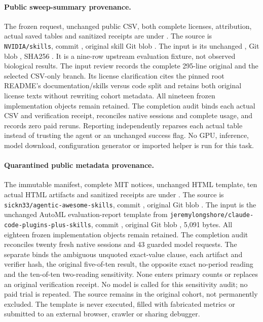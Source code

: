 \documentclass{article}
\theoremstyle{plain}
\theoremstyle{definition}
\newcommand{\id}[1]{\texttt{#1}}
\begin{document}
\paragraph{Public sweep-summary provenance.}
The frozen request, unchanged public CSV, both complete licenses, attribution,
actual saved tables and sanitized receipts are under
.
The source is \id{NVIDIA/skills}, commit
, original skill Git blob
.
The input is its unchanged
,
Git blob , SHA256
.
It is a nine-row upstream evaluation fixture, not observed biological results.
The input review records the complete 295-line original and the selected
CSV-only branch. Its license clarification cites the pinned root README's
documentation/skills versus code split and retains both original license texts
without rewriting cohort metadata. All nineteen frozen implementation objects
remain retained. The completion audit binds each actual CSV and verification
receipt, reconciles native sessions and complete usage, and records zero paid
reruns. Reporting independently reparses each actual table instead of trusting
the agent or an unchanged success flag. No GPU, inference, model download,
configuration generator or imported helper is run for this task.

\paragraph{Quarantined public metadata provenance.}
The immutable manifest, complete MIT notices, unchanged HTML template, ten
actual HTML artifacts and sanitized receipts are under
.
The source is \id{sickn33/agentic-awesome-skills}, commit
, original Git blob
.
The input is the unchanged AutoML evaluation-report template from
\id{jeremylongshore/claude-code-plugins-plus-skills}, commit
, original Git blob
, 5,091 bytes.
All eighteen frozen implementation objects remain retained. The completion
audit reconciles twenty fresh native sessions and 43 guarded model requests.
The separate  binds the ambiguous
unquoted exact-value clause, each artifact and verifier hash, the original
five-of-ten result, the opposite exact no-period reading and the ten-of-ten
two-reading sensitivity. None enters primary counts or replaces an original
verification receipt. No model is called for this sensitivity audit; no paid
trial is repeated. The source remains in the original cohort, not permanently
excluded. The template is never executed, filled with fabricated metrics or
submitted to an external browser, crawler or sharing debugger.
\end{document}
